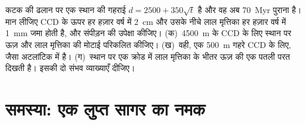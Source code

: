 \begin{exercise}[$\star\star\star$]\label{exo:b1:chemical-biogenic-sediments:12}
कटक की ढलान पर एक स्थान की गहराई $d = 2500 + 350\sqrt t$ है और वह अब \qty{70}{Myr} पुराना है। मान लीजिए  CCD के ऊपर हर हज़ार वर्ष में \qty{2}{cm} और उसके नीचे लाल मृत्तिका हर हज़ार वर्ष में \qty{1}{mm} जमा होती है, और संपीड़न की उपेक्षा कीजिए। (क)~\qty{4500}{m} के CCD के लिए स्थान पर ऊज़ और लाल मृत्तिका की मोटाई परिकलित कीजिए। (ख)~वही, एक \qty{500}{m} गहरे CCD के लिए, जैसा अटलांटिक में है। (ग)~स्थान पर एक क्रोड में लाल मृत्तिका के भीतर ऊज़ की एक पतली परत दिखती है। इसकी दो संभव व्याख्याएँ दीजिए।
\end{exercise}

\section{समस्या: एक लुप्त सागर का नमक}

